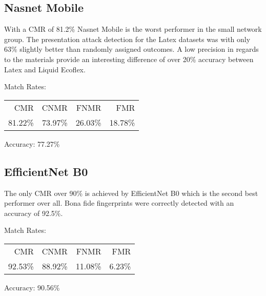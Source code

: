 \subsection{Nasnet Mobile}
\begin{minipage}[c]{0.7\textwidth}

    With a CMR of 81.2\% Nasnet Mobile is the worst performer in the small network group.
    The presentation attack detection for the Latex datasets was with only 63\% slightly better than randomly assigned outcomes.
    A low precision in regards to the materials provide an interesting difference of over 20\% accuracy between Latex and Liquid Ecoflex.

    \medskip\noindent\centering Match Rates: 
    \begin{tabular}{ r  r  r  r |}
        CMR     & CNMR          & FNMR                 & FMR     \\
        81.22\% & 73.97\%       & 26.03\%              & 18.78\%  \\
    \end{tabular} \hspace{2mm} Accuracy: 77.27\%
\end{minipage}
\hfill
\begin{minipage}[c]{0.3\textwidth}
    \centering
    
\end{minipage}



\bigskip
\subsection{EfficientNet B0}
\begin{minipage}[c]{0.7\textwidth}

    The only CMR over 90\% is achieved by EfficientNet B0 which is the second best performer over all.
    Bona fide fingerprints were correctly detected with an accuracy of 92.5\%.
    
    \medskip\noindent\centering Match Rates: 
    \begin{tabular}{ r  r  r  r |}
        CMR     & CNMR          & FNMR                 & FMR     \\
        92.53\% & 88.92\%       & 11.08\%              & 6.23\%  \\
    \end{tabular} \hspace{2mm} Accuracy: 90.56\%
\end{minipage}
\hfill
\begin{minipage}[c]{0.3\textwidth}
    \centering
    
\end{minipage}

